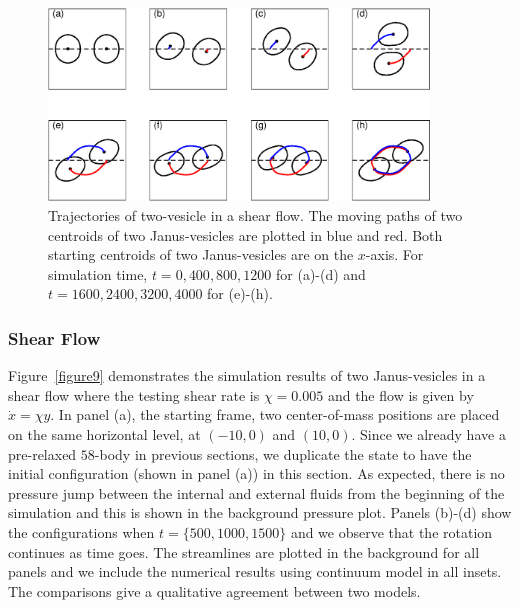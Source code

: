 \documentclass[lineno]{jfm}
\begin{document}
\begin{figure}
\begin{center}
\includegraphics[width=0.9\textwidth]{ShearTraj.eps}
\end{center} 
  \caption{Trajectories of two-vesicle in a shear flow. The moving paths of two centroids of two Janus-vesicles are plotted in blue and red. Both starting centroids of two Janus-vesicles are on the $x$-axis. 
For simulation time, $t = {0, 400,800,1200}$ for (a)-(d) and $t = {1600, 2400, 3200, 4000}$ for (e)-(h).}
    \label{figure10}
\end{figure}




\subsubsection{Shear Flow}

Figure~\ref{figure9} demonstrates the simulation results of two Janus-vesicles in a shear flow where the testing shear rate is $\chi=0.005$ and the flow is given by $\dot x = \chi y$. In panel (a), the starting frame, two center-of-mass positions are placed 
on the same horizontal level, at $(-10,0)$ and $(10,0)$. Since we already have a pre-relaxed $58$-body in previous sections, we duplicate the state to have the initial configuration (shown in panel (a)) in this section. 
As expected, there is no pressure jump between the internal and external fluids from the beginning of the
simulation and this is shown in the background pressure plot. Panels (b)-(d) show the configurations when $t = \{500,1000,1500\}$ 
and we observe that the rotation continues as time goes. The streamlines are plotted in the background 
for all panels and we include the numerical results using continuum model in all insets. 
The comparisons give a qualitative agreement between two models.
\end{document}
